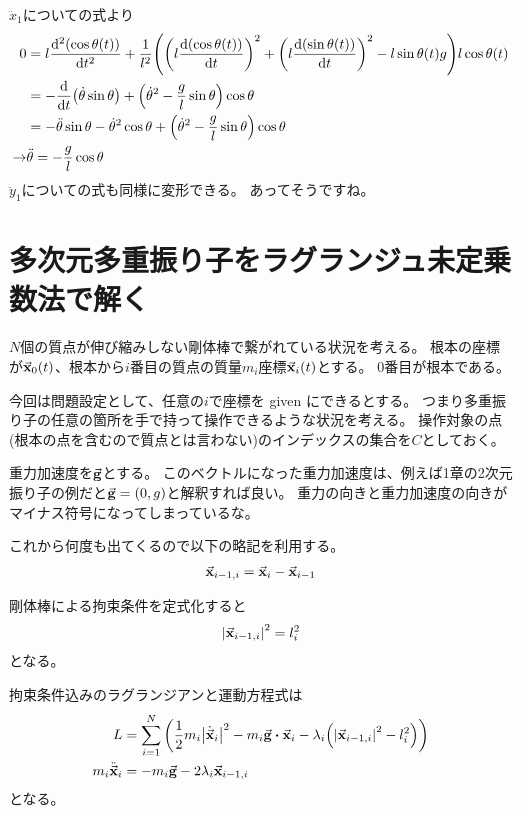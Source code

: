 \documentclass[uplatex]{jsarticle}
\begin{document}
$\ddot{x}_1$についての式より
\begin{align}
    0 &= l\dv[2]{\qty(\cos\theta(t))}{t}
        + \frac{1}{l^2} \qty(
            \qty(l\dv{\qty(\cos\theta(t))}{t})^2 + \qty(l\dv{\qty(\sin\theta(t))}{t})^2
            - l\sin{\theta(t)} g
        ) l\cos{\theta(t)} \nonumber \\
    &= -\dv{}{t}\qty(\dot{\theta}\sin\theta) + \qty(\dot{\theta}^2 - \frac{g}{l}\sin\theta) \cos\theta \nonumber \\
    &= -\ddot{\theta}\sin\theta - \dot{\theta}^2\cos\theta + \qty(\dot{\theta}^2 - \frac{g}{l}\sin\theta) \cos\theta \nonumber \\
    \rightarrow&
    \ddot{\theta} = -\frac{g}{l}\cos\theta
\end{align}
$\ddot{y}_1$についての式も同様に変形できる。
あってそうですね。

\section{多次元多重振り子をラグランジュ未定乗数法で解く}

$N$個の質点が伸び縮みしない剛体棒で繋がれている状況を考える。
根本の座標が$\va{x}_0(t)$、根本から$i$番目の質点の質量$m_i$座標$\va{x}_i(t)$とする。
$0$番目が根本である。

今回は問題設定として、任意の$i$で座標を given にできるとする。
つまり多重振り子の任意の箇所を手で持って操作できるような状況を考える。
操作対象の点(根本の点を含むので質点とは言わない)のインデックスの集合を$C$としておく。

重力加速度を$\va{g}$とする。
このベクトルになった重力加速度は、例えば1章の2次元振り子の例だと$\va{g} = (0, g)$と解釈すれば良い。
重力の向きと重力加速度の向きがマイナス符号になってしまっているな。

これから何度も出てくるので以下の略記を利用する。
\begin{align}
    \va{x}_{i-1,i} = \va{x}_i - \va{x}_{i-1}
\end{align}

剛体棒による拘束条件を定式化すると
\begin{align}
    \abs{\va{x}_{i-1,i}}^2 = l_i^2 \label{nd_mult_cons}
\end{align}
となる。

拘束条件込みのラグランジアンと運動方程式は
\begin{align}
    L &= \sum_{i=1}^N \qty(
        \frac{1}{2} m_i \abs{\dot{\va{x}}_i}^2
        - m_i \va{g} \vdot \va{x}_i
        - \lambda_i \qty(\abs{\va{x}_{i-1,i}}^2 - l_i^2)
    ) \\
    m_i \ddot{\va{x}}_i &= -m_i \va{g} - 2\lambda_i \va{x}_{i-1,i}
\end{align}
となる。
\end{document}
